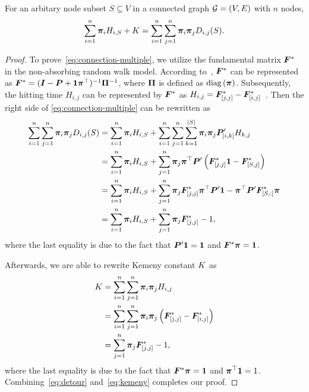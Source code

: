 \documentclass[sigconf]{acmart}
\begin{document}
\begin{theorem}\label{thm:connection-multiple}
    For an arbitary node subset \(S\subseteq V\) in a connected graph \(\mathcal{G}=(V,E)\) with \(n\) nodes,
    \begin{equation}\label{eq:connection-multiple}
        \sum_{i=1}^n\boldsymbol{\pi}_iH_{i,S}+K=\sum_{i=1}^n\sum_{j=1}^n\boldsymbol{\pi}_i\boldsymbol{\pi}_jD_{i,j}(S).
    \end{equation}
\end{theorem}
\begin{proof}
    To prove~\eqref{eq:connection-multiple}, we utilize the fundamental matrix \(\boldsymbol{F}^*\) in the non-absorbing random walk model.
    According to~\cite{BoRaZh11}, \(\boldsymbol{F}^*\) can be represented as \(\boldsymbol{F}^*=(\boldsymbol{I}-\boldsymbol{P}+\boldsymbol{1}\boldsymbol{\pi}^\top)^{-1}\boldsymbol{\Pi}^{-1}\), where \(\boldsymbol{\Pi}\) is defined as \(\rm{diag}\left( \boldsymbol{\pi} \right)\).
    Subsequently, the hitting time \(H_{i,j}\) can be represented by \(\boldsymbol{F}^*\) as \(H_{i,j}=\boldsymbol{F}^*_{[j,j]}-\boldsymbol{F}^*_{[i,j]}\)~\cite{BoRaZh11}.
    Then the right side of \eqref{eq:connection-multiple} can be rewritten as
    \begin{equation}\label{eq:detour}
        \begin{split}
            \sum_{i=1}^n\sum_{j=1}^n\boldsymbol{\pi}_i\boldsymbol{\pi}_jD_{i,j}(S)
            & =\sum_{i=1}^n\boldsymbol{\pi}_i H_{i,S}+\sum_{i=1}^n\sum_{j=1}^n\sum_{k=1}^{\left|S \right|}\boldsymbol{\pi}_i\boldsymbol{\pi}_j\boldsymbol{P}'_{[i,k]}H_{k,j}  \\
            & =\sum_{i=1}^n\boldsymbol{\pi}_i H_{i,S}+\sum_{j=1}^n\boldsymbol{\pi}_j\boldsymbol{\pi}^\top\boldsymbol{P}'\left( \boldsymbol{F}^*_{[j,j]}\boldsymbol{1}-\boldsymbol{F}^*_{[S,j]} \right)                        \\
            & =\sum_{i=1}^n\boldsymbol{\pi}_i H_{i,S}+\sum_{j=1}^n\boldsymbol{\pi}_j\boldsymbol{F}^*_{[j,j]}\boldsymbol{\pi}^\top\boldsymbol{P}'\boldsymbol{1}-\boldsymbol{\pi}^\top\boldsymbol{P}'\boldsymbol{F}^*_{[S,:]}\boldsymbol{\pi} \\
            & =\sum_{i=1}^n\boldsymbol{\pi}_i H_{i,S}+\sum_{j=1}^n\boldsymbol{\pi}_j\boldsymbol{F}^*_{[j,j]}-1,
        \end{split}
    \end{equation}
    where the last equality is due to the fact that \(\boldsymbol{P}'\boldsymbol{1}=\boldsymbol{1}\) and \(\boldsymbol{F}^*\boldsymbol{\pi}=\boldsymbol{1}\).

    Afterwards, we are able to rewrite Kemeny constant \(K\) as
    \begin{equation}\label{eq:kemeny}
        \begin{split}
            K&=\sum_{i=1}^n\sum_{j=1}^n\boldsymbol{\pi}_i\boldsymbol{\pi}_jH_{i,j}\\
            &=\sum_{i=1}^n\sum_{j=1}^n\boldsymbol{\pi}_i\boldsymbol{\pi}_j\left( \boldsymbol{F}^*_{[j,j]}-\boldsymbol{F}^*_{[i,j]} \right)\\
            &=\sum_{j=1}^n\boldsymbol{\pi}_j\boldsymbol{F}^*_{[j,j]}-1,
        \end{split}
    \end{equation}
    where the last equality is due to the fact that \(\boldsymbol{F}^*\boldsymbol{\pi}=\boldsymbol{1}\) and \(\boldsymbol{\pi}^\top\boldsymbol{1}=1\).
    Combining~\eqref{eq:detour} and~\eqref{eq:kemeny} completes our proof.
\end{proof}
\end{document}
